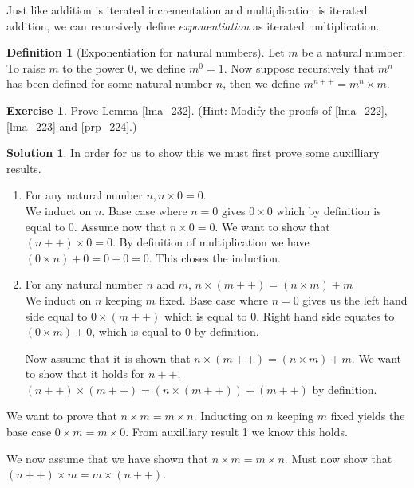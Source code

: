 \documentclass[a4paper, twocolumn]{report}
\newcounter{dummy} \numberwithin{dummy}{section}
\newcounter{exercise} \numberwithin{exercise}{section}
\theoremstyle{definition}
\newtheorem{defn}[dummy]{Definition}
\newtheorem{exc}[exercise]{Exercise}
\theoremstyle{solution}
\newtheorem*{sltn}{Solution}
\newcommand{\dplus}{{+}{+}} %
\begin{document}
\addtocounter{dummy}{1}

Just like addition is iterated incrementation and multiplication is iterated
addition, we can recursively define \textit{exponentiation} as iterated
multiplication.

\begin{defn}[Exponentiation for natural numbers]
  Let $m$ be a natural number. To raise $m$ to the power $0$, we define $m^{0}
  = 1$. Now suppose recursively that $m^{n}$ has been defined for some natural
  number $n$, then we define $m^{n\dplus} = m^{n} \times m$.
\end{defn}

\begin{exc}
  Prove Lemma \ref{lma_232}. (Hint: Modify the proofs of \ref{lma_222},
  \ref{lma_223} and \ref{prp_224}.)
\end{exc}
\begin{sltn}
  In order for us to show this we must first prove some auxilliary results.
  \begin{enumerate}
    \item For any natural number $n, n \times 0 = 0$.\\
      [0.2cm]
      We induct on $n$.  Base case where $n = 0$ gives $0 \times 0$ which by
      definition is equal to $0$.  Assume now that $n \times 0 = 0$. We want to
      show that $(n\dplus) \times 0 = 0$.  By definition of multiplication we
      have $(0 \times n) + 0 = 0 + 0 = 0$.  This closes the induction.

    \item For any natural number $n$ and $m$, $n\times(m\dplus) = (n\times m) + m$\\
      [0.2cm]
      We induct on $n$ keeping $m$ fixed.  Base case where $n = 0$ gives us the
      left hand side equal to $0 \times (m \dplus)$ which is equal to $0$.
      Right hand side equates to $(0\times m) + 0$, which is equal to $0$ by
      definition.
      
      Now assume that it is shown that $n\times(m\dplus) = (n\times m) + m$.
      We want to show that it holds for $n\dplus$.  $(n\dplus)\times(m\dplus) =
      (n\times(m\dplus)) + (m\dplus)$ by definition.

  \end{enumerate}
      We want to prove that $n \times m = m \times n$.
      Inducting on $n$ keeping $m$ fixed yields the base case
      $0 \times m = m \times 0$. From auxilliary result 1 we know this holds.

      We now assume that we have shown that $n \times m = m \times n$.
      Must now show that $\left( n\dplus \right) \times m = m \times \left( n\dplus \right)$.

\end{sltn}
\todos
\end{document}
